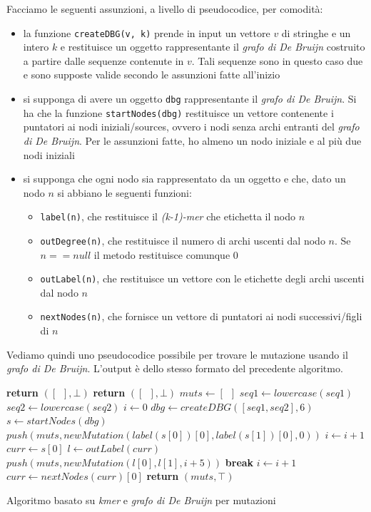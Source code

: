 \documentclass[a4paper,12pt, oneside]{book}
\begin{document}
\noindent
Facciamo le seguenti assunzioni, a livello di pseudocodice, per comodità:
\begin{itemize}
  \item la funzione \texttt{createDBG(v, k)} prende in input un vettore $v$ di
  stringhe e un intero $k$ e restituisce un oggetto rappresentante il
  \textit{grafo di De Bruijn} costruito a  
  partire dalle sequenze contenute in $v$. Tali sequenze sono in questo caso due
  e sono supposte valide secondo le assunzioni fatte all'inizio
  \item si supponga di avere un oggetto \texttt{dbg} rappresentante il
  \textit{grafo di De Bruijn}. Si ha che la funzione \texttt{startNodes(dbg)}
  restituisce un vettore contenente i puntatori ai nodi iniziali/sources, ovvero
  i nodi 
  senza archi entranti del \textit{grafo di De Bruijn}. Per le assunzioni fatte,
  ho almeno un nodo iniziale e al più due nodi iniziali
  \item si supponga che ogni nodo sia rappresentato da un oggetto e che, dato un
  nodo $n$ si abbiano le seguenti funzioni:
  \begin{itemize}
    \item \texttt{label(n)}, che restituisce il \textit{(k-1)-mer} che
    etichetta il nodo $n$
    \item \texttt{outDegree(n)}, che restituisce il numero di archi uscenti dal
    nodo $n$. Se $n==null$ il metodo restituisce comunque 0
    \item \texttt{outLabel(n)}, che restituisce un vettore con le etichette
    degli archi uscenti dal nodo $n$
    \item \texttt{nextNodes(n)}, che fornisce un vettore di puntatori ai nodi
    successivi/figli di $n$
 \end{itemize}
\end{itemize}
\newpage
Vediamo quindi uno pseudocodice possibile per trovare le mutazione usando il
\textit{grafo di De Bruijn}. L'output è dello stesso formato del precedente
algoritmo. 
\begin{algorithm}[H]
  \small
  \begin{algorithmic}[1]
    \State \textbf{return} $([\,\,\,],\bot)$
    \EndIf
    \State \textbf{return} $([\,\,\,],\bot)$
    \EndIf
    \State $muts \gets [\,\,\,]$
    \State $seq1\gets lowercase(seq1)$
    \State $seq2\gets lowercase(seq2)$
    \State $i\gets 0$
    \State $dbg\gets createDBG([seq1, seq2], 6)$
    \State $s \gets startNodes(dbg)$
    \State $push(muts, newMutation(label(s[0])[0], label(s[1])[0], 0))$ 
    \State $i\gets i+1$
    \EndIf
    \State $curr\gets s[0]$
    \While {$\top$}
    \State $l\gets outLabel(curr)$
    \State $push(muts, newMutation(l[0],l[1], i+5))$
    \EndIf
    \State \textbf{break}
    \EndIf
    \State $i\gets i+1$
    \State $curr\gets nextNodes(curr)[0]$
    \EndWhile
    \State \textbf{return} $(muts, \top)$
    \EndFunction
  \end{algorithmic}
  \caption{Algoritmo basato su \textit{kmer} e \textit{grafo di De Bruijn} per
  mutazioni} 
\end{algorithm}
\end{document}
